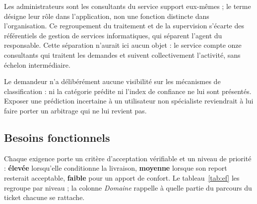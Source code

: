 Les administrateurs sont les consultants du service support eux-mêmes ; le terme désigne leur rôle
dans l'application, non une fonction distincte dans l'organisation. Ce regroupement du traitement et
de la supervision s'écarte des référentiels de gestion de services informatiques, qui séparent
l'agent du responsable. Cette séparation n'aurait ici aucun objet : le service compte onze
consultants qui traitent les demandes et suivent collectivement l'activité, sans échelon
intermédiaire.

Le demandeur n'a délibérément aucune visibilité sur les mécanismes de classification : ni la
catégorie prédite ni l'index de confiance ne lui sont présentés. Exposer une prédiction incertaine à
un utilisateur non spécialiste reviendrait à lui faire porter un arbitrage qui ne lui revient pas.

\subsection{Besoins fonctionnels}

Chaque exigence porte un critère d'acceptation vérifiable et un niveau de priorité : \textbf{élevée}
lorsqu'elle conditionne la livraison, \textbf{moyenne} lorsque son report resterait acceptable,
\textbf{faible} pour un apport de confort. Le tableau~\ref{tab:ef} les regroupe par niveau ; la
colonne \emph{Domaine} rappelle à quelle partie du parcours du ticket chacune se rattache.

